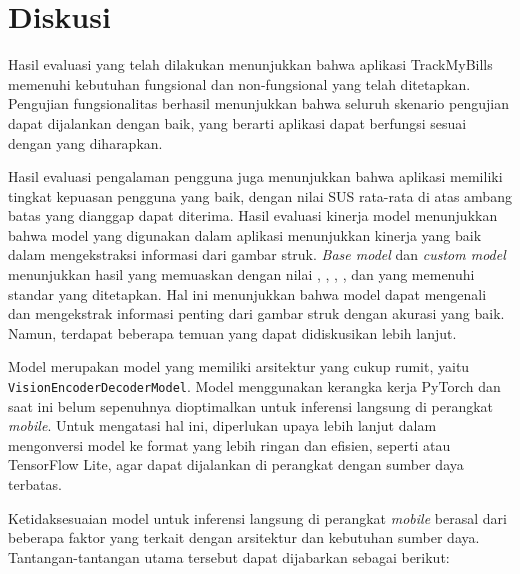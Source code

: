 \section{Diskusi}
\label{sec:diskusi}

Hasil evaluasi yang telah dilakukan menunjukkan bahwa aplikasi TrackMyBills memenuhi kebutuhan fungsional dan non-fungsional yang telah ditetapkan. Pengujian fungsionalitas berhasil menunjukkan bahwa seluruh skenario pengujian dapat dijalankan dengan baik, yang berarti aplikasi dapat berfungsi sesuai dengan yang diharapkan. 

Hasil evaluasi pengalaman pengguna juga menunjukkan bahwa aplikasi memiliki tingkat kepuasan pengguna yang baik, dengan nilai SUS rata-rata di atas ambang batas yang dianggap dapat diterima. Hasil evaluasi kinerja model menunjukkan bahwa model yang digunakan dalam aplikasi menunjukkan kinerja yang baik dalam mengekstraksi informasi dari gambar struk. \emph{Base model} dan \emph{custom model} menunjukkan hasil yang memuaskan dengan nilai \accuracy, \precision, \recall, \fscore, dan \mcer{} yang memenuhi standar yang ditetapkan. Hal ini menunjukkan bahwa model dapat mengenali dan mengekstrak informasi penting dari gambar struk dengan akurasi yang baik. Namun, terdapat beberapa temuan yang dapat didiskusikan lebih lanjut.

Model \donut{} merupakan model yang memiliki arsitektur yang cukup rumit, yaitu \texttt{VisionEncoderDecoderModel}. Model \donut{} menggunakan kerangka kerja PyTorch dan saat ini belum sepenuhnya dioptimalkan untuk inferensi langsung di perangkat \emph{mobile}. Untuk mengatasi hal ini, diperlukan upaya lebih lanjut dalam mengonversi model ke format yang lebih ringan dan efisien, seperti \onnx{} atau TensorFlow Lite, agar dapat dijalankan di perangkat dengan sumber daya terbatas.

Ketidaksesuaian model \donut{} untuk inferensi langsung di perangkat \emph{mobile} berasal dari beberapa faktor yang terkait dengan arsitektur dan kebutuhan sumber daya. Tantangan-tantangan utama tersebut dapat dijabarkan sebagai berikut:

